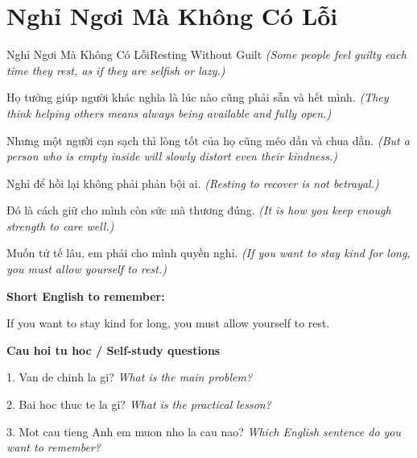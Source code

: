 \section{Nghỉ Ngơi Mà Không Có Lỗi}
\begin{truyen}{Nghỉ Ngơi Mà Không Có Lỗi}{Resting Without Guilt}
\textit{(Some people feel guilty each time they rest, as if they are selfish or lazy.)}

Họ tưởng giúp người khác nghĩa là lúc nào cũng phải sẵn và hết mình.
\textit{(They think helping others means always being available and fully open.)}

Nhưng một người cạn sạch thì lòng tốt của họ cũng méo dần và chua dần.
\textit{(But a person who is empty inside will slowly distort even their kindness.)}

Nghỉ để hồi lại không phải phản bội ai.
\textit{(Resting to recover is not betrayal.)}

Đó là cách giữ cho mình còn sức mà thương đúng.
\textit{(It is how you keep enough strength to care well.)}

\end{truyen}

\begin{baihoc}
Muốn tử tế lâu, em phải cho mình quyền nghỉ.
\textit{(If you want to stay kind for long, you must allow yourself to rest.)}
\end{baihoc}

\begin{ghinhoanh}
\textbf{Short English to remember:}

If you want to stay kind for long, you must allow yourself to rest.

\end{ghinhoanh}

\begin{tuhocnhanh}
\textbf{Cau hoi tu hoc / Self-study questions}

1. Van de chinh la gi? \textit{What is the main problem?}

2. Bai hoc thuc te la gi? \textit{What is the practical lesson?}

3. Mot cau tieng Anh em muon nho la cau nao? \textit{Which English sentence do you want to remember?}
\end{tuhocnhanh}

